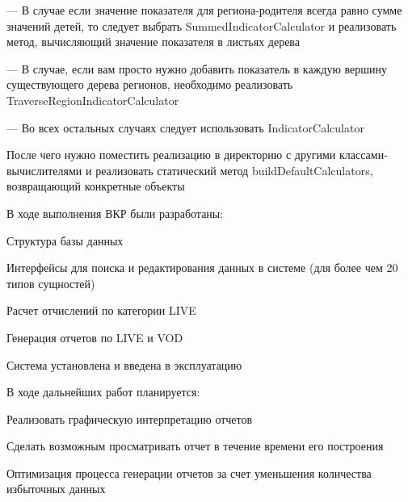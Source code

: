 \documentclass[a4paper]{article}
\begin{document}
--- В случае если значение показателя для региона-родителя всегда равно сумме значений детей, то следует выбрать SummedIndicatorCalculator и реализовать метод, вычисляющий значение показателя в листьях дерева

--- В случае, если вам просто нужно добавить показатель в каждую вершину существующего дерева регионов, необходимо реализовать TraverseRegionIndicatorCalculator

--- Во всех остальных случаях следует использовать IndicatorCalculator

После чего нужно поместить реализацию в директорию с другими классами-вычислителями
и реализовать статический метод buildDefaultCalculators, возвращающий конкретные объекты

\newpage

В ходе выполнения ВКР были разработаны:

Структура базы данных 

Интерфейсы для поиска и редактирования данных в системе (для более чем 20 типов сущностей)

Расчет отчислений по категории LIVE

Генерация отчетов по LIVE и VOD

Система установлена и введена в эксплуатацию

\newpage
В ходе дальнейших работ планируется:

Реализовать графическую интерпретацию отчетов

Сделать возможным просматривать отчет в течение времени его построения

Оптимизация процесса генерации отчетов за счет уменьшения количества избыточных данных
\end{document}
